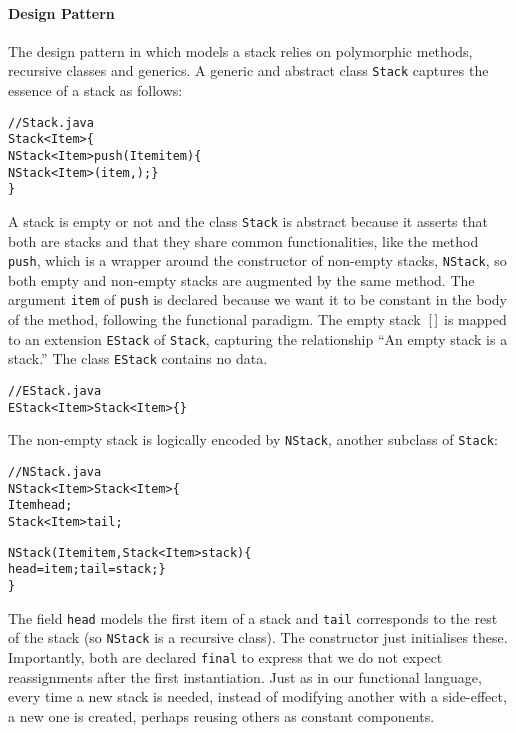 \paragraph{Design Pattern}

The design pattern in \Java which models a stack  relies on polymorphic methods, recursive classes and
generics. A generic and abstract class \texttt{Stack} captures the
essence of a stack as follows:
\begin{alltt}
// Stack.java
\public \abstractX \class Stack<Item> \{
  \public \final NStack<Item> push(\final Item item) \{
    \return \new NStack<Item>(item,\this); \}
\}
\end{alltt}
A stack is empty or not and the class \texttt{Stack} is abstract
because it asserts that both are stacks and that they share common
functionalities, like the method \texttt{push}, which is a wrapper
around the constructor of non\hyp{}empty stacks, \texttt{NStack}, so
both empty and non\hyp{}empty stacks are augmented by the same
method. The argument \texttt{item} of \texttt{push} is declared
\final{} because we want it to be constant in the body of the method,
following the functional paradigm. The empty stack~\([\,]\) is mapped
to an extension \texttt{EStack} of \texttt{Stack}, capturing the
relationship ``An empty stack is a stack.'' The class \texttt{EStack}
contains no data.
\begin{alltt}
// EStack.java
\public \final \class EStack<Item> \extends Stack<Item> \{\}
\end{alltt}
The non\hyp{}empty stack is logically encoded by \texttt{NStack},
another subclass of \texttt{Stack}:
\begin{alltt}
// NStack.java
\public \final \class NStack<Item> \extends Stack<Item> \{
  \private \final Item head;
  \private \final Stack<Item> tail;

  \public NStack(\final Item item, \final Stack<Item> stack) \{
    head = item; tail = stack; \}
\}
\end{alltt}
The field \texttt{head} models the first item of a stack and
\texttt{tail} corresponds to the rest of the stack (so \texttt{NStack}
is a recursive class). The constructor just initialises
these. Importantly, both are declared \texttt{final} to express that
we do not expect reassignments after the first instantiation. Just as
in our functional language, every time a new stack is needed, instead
of modifying another with a side\hyp{}effect, a new one is created,
perhaps reusing others as constant components.

